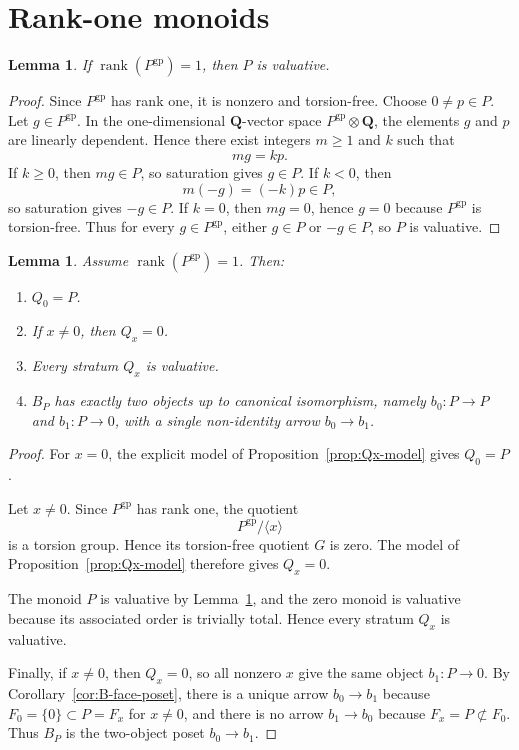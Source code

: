 \documentclass[12pt]{article}
\newtheorem{lemma}[theorem]{Lemma}
\theoremstyle{definition}
\theoremstyle{remark}
\numberwithin{equation}{section}
\newcommand{\gp}{\mathrm{gp}}
\begin{document}
\section{Rank-one monoids}

\begin{lemma}\label{lem:rank-one-valuative}
If \(\operatorname{rank}(P^{\gp})=1\), then \(P\) is valuative.
\end{lemma}

\begin{proof}
Since \(P^{\gp}\) has rank one, it is nonzero and torsion-free.  Choose \(0\neq p\in P\).  Let \(g\in P^{\gp}\).  In the one-dimensional \(\mathbf Q\)-vector space \(P^{\gp}\otimes\mathbf Q\), the elements \(g\) and \(p\) are linearly dependent.  Hence there exist integers \(m\geq 1\) and \(k\) such that
\[
mg=kp.
\]
If \(k\geq 0\), then \(mg\in P\), so saturation gives \(g\in P\).  If \(k<0\), then
\[
m(-g)=(-k)p\in P,
\]
so saturation gives \(-g\in P\).  If \(k=0\), then \(mg=0\), hence \(g=0\) because \(P^{\gp}\) is torsion-free.  Thus for every \(g\in P^{\gp}\), either \(g\in P\) or \(-g\in P\), so \(P\) is valuative.
\end{proof}

\begin{lemma}\label{lem:rank-one-strata}
Assume \(\operatorname{rank}(P^{\gp})=1\).  Then:
\begin{enumerate}[label=(\roman*)]
\item \(Q_0=P\).
\item If \(x\neq 0\), then \(Q_x=0\).
\item Every stratum \(Q_x\) is valuative.
\item \(B_P\) has exactly two objects up to canonical isomorphism, namely \(b_0:P\to P\) and \(b_1:P\to 0\), with a single non-identity arrow \(b_0\to b_1\).
\end{enumerate}
\end{lemma}

\begin{proof}
For \(x=0\), the explicit model of Proposition~\ref{prop:Qx-model} gives \(Q_0=P\).

Let \(x\neq 0\).  Since \(P^{\gp}\) has rank one, the quotient
\[
P^{\gp}/\langle x\rangle
\]
is a torsion group.  Hence its torsion-free quotient \(G\) is zero.  The model of Proposition~\ref{prop:Qx-model} therefore gives \(Q_x=0\).

The monoid \(P\) is valuative by Lemma~\ref{lem:rank-one-valuative}, and the zero monoid is valuative because its associated order is trivially total.  Hence every stratum \(Q_x\) is valuative.

Finally, if \(x\neq 0\), then \(Q_x=0\), so all nonzero \(x\) give the same object \(b_1:P\to 0\).  By Corollary~\ref{cor:B-face-poset}, there is a unique arrow \(b_0\to b_1\) because \(F_0=\{0\}\subset P=F_x\) for \(x\neq 0\), and there is no arrow \(b_1\to b_0\) because \(F_x=P\not\subset F_0\).  Thus \(B_P\) is the two-object poset \(b_0\to b_1\).
\end{proof}
\end{document}
